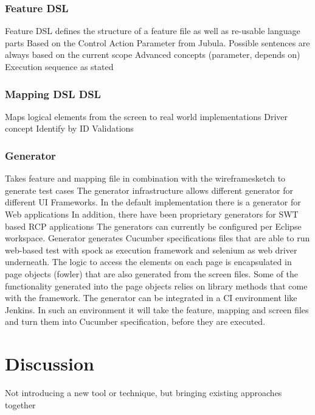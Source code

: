 \documentclass{sig-alternate-05-2015}
\begin{document}
\subsubsection{Feature DSL}
Feature DSL defines the structure of a feature file as well as re-usable language parts
Based on the Control Action Parameter from Jubula.
Possible sentences are always based on the current scope
Advanced concepts (parameter, depends on)
Execution sequence as stated

\subsubsection{Mapping DSL DSL}
Maps logical elements from the screen to real world implementations
Driver concept
Identify by ID
Validations


\subsubsection{Generator}
Takes feature and mapping file in combination with the wireframesketch to generate test cases
The generator infrastructure allows different generator for different UI Frameworks. In the default implementation there is a generator for Web applications
In addition, there have been proprietary generators for SWT based RCP applications
The generators can currently be configured per Eclipse workspace.
Generator generates Cucumber specifications files that are able to run web-based test with spock as execution framework and selenium as web driver underneath. 
The logic to access the elements on each page is encapsulated in page objects (fowler) that are also generated from the screen files. Some of the functionality generated into the page objects relies on library methods that come with the framework. 
The generator can be integrated in a CI environment like Jenkins. In such an environment it will take the feature, mapping and screen files and turn them into Cucumber specification, before they are executed. 

\section{Discussion}\label{sec:Discussion}
Not introducing a new tool or technique, but bringing existing approaches together
\end{document}
